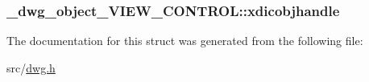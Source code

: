 \hypertarget{struct__dwg__object__VIEW__CONTROL_ae25699d3e852215faa9a7c4a692fbb3a}{
\subsubsection[{xdicobjhandle}]{ {\bf \-\_\-dwg\-\_\-object\-\_\-\-V\-I\-E\-W\-\_\-\-C\-O\-N\-T\-R\-O\-L\-::xdicobjhandle}}}\label{struct__dwg__object__VIEW__CONTROL_ae25699d3e852215faa9a7c4a692fbb3a}


\-The documentation for this struct was generated from the following file\-:\begin{DoxyCompactItemize}
\item 
src/\hyperlink{dwg_8h}{dwg.\-h}\end{DoxyCompactItemize}
